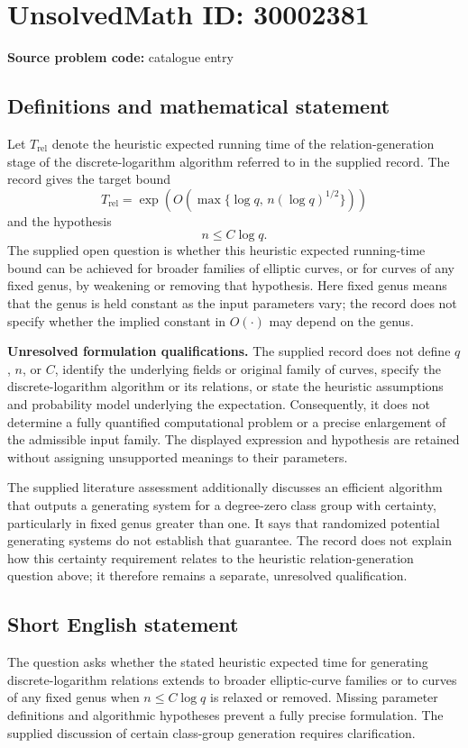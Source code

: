 \documentclass[11pt]{article}
\begin{document}
\section*{UnsolvedMath ID: 30002381}
\textbf{Source problem code:} catalogue entry
\subsection{Definitions and mathematical statement}
Let \(T_{\mathrm{rel}}\) denote the heuristic expected running time of the relation-generation stage of the discrete-logarithm algorithm referred to in the supplied record. The record gives the target bound
\[
T_{\mathrm{rel}}=\exp\!\left(O\!\left(\max\{\log q,\,n(\log q)^{1/2}\}\right)\right)
\]
and the hypothesis
\[
n\leq C\log q.
\]
The supplied open question is whether this heuristic expected running-time bound can be achieved for broader families of elliptic curves, or for curves of any fixed genus, by weakening or removing that hypothesis. Here fixed genus means that the genus is held constant as the input parameters vary; the record does not specify whether the implied constant in \(O(\cdot)\) may depend on the genus.

\textbf{Unresolved formulation qualifications.} The supplied record does not define \(q\), \(n\), or \(C\), identify the underlying fields or original family of curves, specify the discrete-logarithm algorithm or its relations, or state the heuristic assumptions and probability model underlying the expectation. Consequently, it does not determine a fully quantified computational problem or a precise enlargement of the admissible input family. The displayed expression and hypothesis are retained without assigning unsupported meanings to their parameters.

The supplied literature assessment additionally discusses an efficient algorithm that outputs a generating system for a degree-zero class group with certainty, particularly in fixed genus greater than one. It says that randomized potential generating systems do not establish that guarantee. The record does not explain how this certainty requirement relates to the heuristic relation-generation question above; it therefore remains a separate, unresolved qualification.
\subsection{Short English statement}
The question asks whether the stated heuristic expected time for generating discrete-logarithm relations extends to broader elliptic-curve families or to curves of any fixed genus when \(n\leq C\log q\) is relaxed or removed. Missing parameter definitions and algorithmic hypotheses prevent a fully precise formulation. The supplied discussion of certain class-group generation requires clarification.
\end{document}
